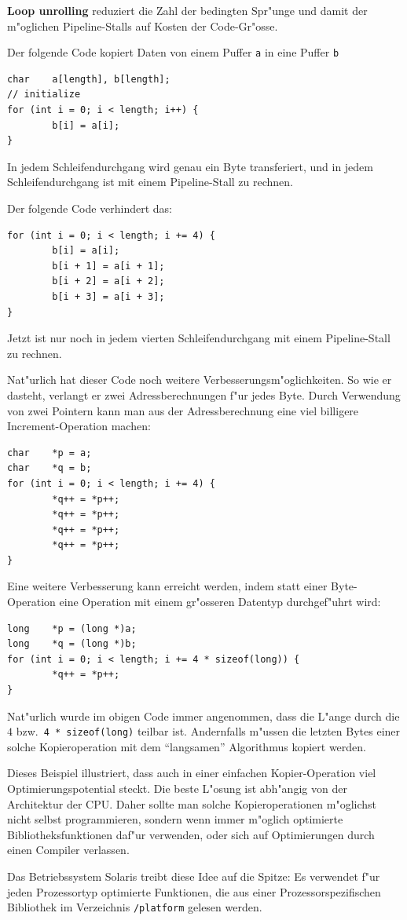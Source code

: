{\bf Loop unrolling} reduziert die Zahl der bedingten Spr"unge und damit
der m"oglichen Pipeline-Stalls auf Kosten der Code-Gr"osse.

\begin{beispiel}
Der folgende Code kopiert Daten von einem Puffer {\tt a} in eine Puffer {\tt b}
\begin{verbatim}
char    a[length], b[length];
// initialize
for (int i = 0; i < length; i++) {
        b[i] = a[i];
}
\end{verbatim}
In jedem Schleifendurchgang wird genau ein Byte transferiert, und in jedem
Schleifendurchgang ist mit einem Pipeline-Stall zu rechnen. 

Der folgende Code verhindert das:
\begin{verbatim}
for (int i = 0; i < length; i += 4) {
        b[i] = a[i];
        b[i + 1] = a[i + 1];
        b[i + 2] = a[i + 2];
        b[i + 3] = a[i + 3];
}
\end{verbatim}
Jetzt ist nur noch in jedem vierten Schleifendurchgang mit einem Pipeline-Stall
zu rechnen.

Nat"urlich hat dieser Code noch weitere Verbesserungsm"oglichkeiten.
So wie er dasteht, verlangt er zwei Adressberechnungen f"ur jedes Byte.
Durch Verwendung von zwei Pointern kann man aus der Adressberechnung
eine viel billigere Increment-Operation machen:
\begin{verbatim}
char    *p = a;
char    *q = b;
for (int i = 0; i < length; i += 4) {
        *q++ = *p++;
        *q++ = *p++;
        *q++ = *p++;
        *q++ = *p++;
}
\end{verbatim}
Eine weitere Verbesserung kann erreicht werden, indem statt einer
Byte-Operation eine Operation mit einem gr"osseren Datentyp durchgef"uhrt wird:
\begin{verbatim}
long    *p = (long *)a;
long    *q = (long *)b;
for (int i = 0; i < length; i += 4 * sizeof(long)) {
        *q++ = *p++;
}
\end{verbatim}
Nat"urlich wurde im obigen Code immer angenommen, dass die L"ange durch
die $4$ bzw.~\verb+4 * sizeof(long)+ teilbar ist.
Andernfalls m"ussen die letzten Bytes einer solche Kopieroperation mit
dem ``langsamen'' Algorithmus kopiert werden.

Dieses Beispiel illustriert, dass auch in einer einfachen Kopier-Operation
viel Optimierungspotential steckt. Die beste L"osung  ist abh"angig von der
Architektur der CPU. Daher sollte man solche Kopieroperationen m"oglichst
nicht selbst programmieren, sondern wenn immer m"oglich optimierte
Bibliotheksfunktionen daf"ur verwenden, oder sich auf Optimierungen durch
einen Compiler verlassen.

Das Betriebssystem Solaris treibt diese Idee auf die Spitze:
Es verwendet f"ur jeden Prozessortyp optimierte
Funktionen, die aus einer Prozessorspezifischen Bibliothek
im Verzeichnis \verb+/platform+ gelesen werden.
\end{beispiel}

